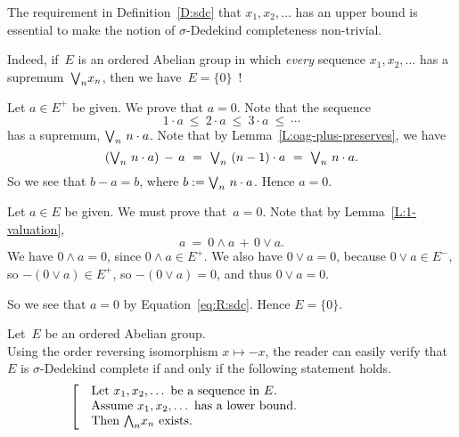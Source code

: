 \documentclass[main.tex]{subfiles}
\begin{document}
\begin{rem}
The requirement
in Definition~\ref{D:sdc}
 that $x_1,x_2,\dotsc$
has an upper bound 
is essential
to make the notion
of $\sigma$-Dedekind completeness non-trivial.

Indeed,
if~$E$ is an ordered Abelian group
in which \emph{every} sequence $x_1,x_2,\dotsc$ has a supremum~$\textstyle{\bigvee}_n x_n$,
then we have~$E=\{0\}$~!

Let $a\in E^+$ be given. We prove that $a=0$.
Note that the sequence
\begin{equation*}
1\cdot a  \ \leq\ 2\cdot a \ \leq\  3\cdot a \ \leq\ \dotsb
\end{equation*}
has a supremum, $\textstyle{\bigvee}_n \ n\cdot a$.
Note that by Lemma~\ref{L:oag-plus-preserves}, we have
\begin{equation*}
(\bv_n\ n\cdot a)\,-\,a\ =\ 
\bv_n \ (n-1) \cdot a \ = \ 
\bv_n\ n\cdot a.
\end{equation*}
So we see that $b-a = b$,
where $b:= \textstyle{\bigvee}_n \ n\cdot a$.
Hence $a=0$.

Let $a\in E$ be given.
We must prove that~$a=0$.
Note that
by Lemma~\ref{L:1-valuation},
\begin{equation}
\label{eq:R:sdc}
a\ = \ 0\wedge a \,+\, 0\vee a.
\end{equation}
We have $0\wedge a =0$,
since $0\wedge a \in E^+$.
We also have $0\vee a=0$,
because $0\vee a\in E^-$,
so $-(0\vee a)\in E^+$, so $-(0\vee a)=0$,
and thus $0\vee a=0$.

So we see that $a=0$ by Equation~\eqref{eq:R:sdc}.
Hence $E=\{0\}$.
\end{rem}
%
%
\begin{rem}
\label{R:sdc}
Let~$E$ be an ordered Abelian group.\\
Using the order reversing isomorphism $x\mapsto -x$,
the reader can easily verify that
$E$ is $\sigma$-Dedekind complete
if and only if the following statement holds.
\begin{equation*}
\left[\quad
\begin{minipage}{.7\columnwidth}
Let $x_1,x_2,\dotsc$ be a sequence in~$E$.\\
Assume $x_1,x_2,\dotsc$ has a lower bound.\\
Then $\bw_n x_n$ exists.
\end{minipage}
\right.
\end{equation*}
\end{rem}
\end{document}
